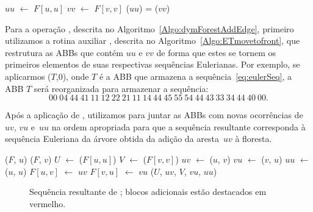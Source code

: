 \begin{algorithm}[htb]
\caption{\dymForestQuery($F$, $u$, $v$)}
\label{Algo:dymForestQuery}
\begin{algorithmic}[1]
\State $uu$ $\gets$ $F[u,u]$
\State $vv$ $\gets$ $F[v,v]$
\State \Return \treapGetRoot($uu$) = \treapGetRoot($vv$)
\end{algorithmic}
\end{algorithm}

Para a operação \dymForestAddEdge{}, descrita no Algoritmo~\ref{Algo:dymForestAddEdge}, primeiro utilizamos a rotina auxiliar \ETmovetofront{}, descrita no Algoritmo~\ref{Algo:ETmovetofront}, que restrutura as ABBs que contém $uu$ e $vv$ de forma que estes se tornem os primeiros elementos de suas respectivas sequências Eulerianas. Por exemplo, se aplicarmos \ETmovetofront($T$,0), onde $T$ é a ABB que armazena a sequência~\eqref{eq:eulerSeq}, a ABB $T$ será reorganizada para armazenar a sequência:
\begin{equation}
00~04~44~41~11~12~22~21~11~14~44~45~55~54~44~43~33~34~44~40~00.\nonumber
\end{equation}

Após a aplicação de \ETmovetofront{}, utilizamos \treapJoin{} para juntar as ABBs com novas ocorrências de $uv$, $vu$ e~$uu$ na ordem apropriada para que a sequência resultante corresponda à sequência Euleriana da árvore obtida da adição da aresta~$uv$ à floresta.

\begin{algorithm}[htb]
\caption{\dymForestAddEdge($F$, $u$, $v$)}
\label{Algo:dymForestAddEdge}
\begin{algorithmic}[1]
\State \ETmovetofront($F$, $u$)
\State \ETmovetofront($F$, $v$)
\State $U$ $\gets$ \treapGetRoot($F[u,u]$)
\State $V$ $\gets$ \treapGetRoot($F[v,v]$)
\State $uv$ $\gets$ \treapCreate($u$, $v$)
\State $vu$ $\gets$ \treapCreate($v$, $u$)
\State $uu$ $\gets$ \treapCreate($u$, $u$)
\State $F[u,v]$ $\gets$ $uv$
\State $F[v,u]$ $\gets$ $vu$
\State \treapJoin($U$, $uv$, $V$, $vu$, $uu$)
\end{algorithmic}
\end{algorithm}
\begin{figure}[htb]
\centering

\caption{Sequência resultante de \dymForestAddEdge{}; blocos adicionais estão destacados em vermelho.}
\label{fig:algorit-link-seqxy}
\end{figure}


